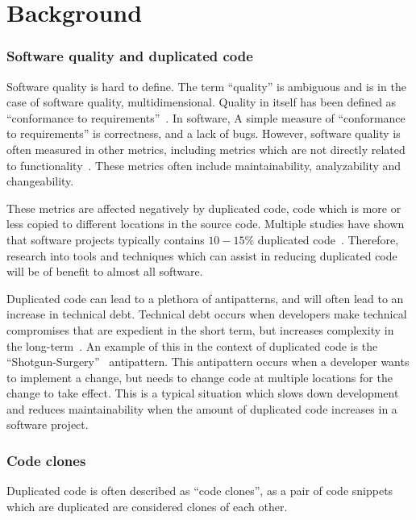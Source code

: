 \chapter{Background}


\subsection{Software quality and duplicated code}

Software quality is hard to define. The term ``quality'' is ambiguous and is in the case
of software quality, multidimensional. Quality in itself has been defined as ``conformance
to requirements''~\cite[8]{crosby1980quality}. In software, A simple measure of
``conformance to requirements'' is correctness, and a lack of bugs. However, software
quality is often measured in other metrics, including metrics which are not directly
related to functionality~\cite[29]{MetricsAndModelsInSoftwareQuality}. These metrics
often include maintainability, analyzability and changeability.

These metrics are affected negatively by duplicated code, code which is more or less
copied to different locations in the source code. Multiple studies have shown that
software projects typically contains $10-15\%$ duplicated code~\cite{CloningByAccident}.
Therefore, research into tools and techniques which can assist in reducing duplicated code
will be of benefit to almost all software.

Duplicated code can lead to a plethora of antipatterns, and will often lead to an increase
in technical debt. Technical debt occurs when developers make technical compromises that
are expedient in the short term, but increases complexity in the
long-term~\cite[111]{TechnicalDebt}. An example of this in the context of duplicated code
is the ``Shotgun-Surgery''~\cite[66]{fowlerrefactoring} antipattern. This antipattern
occurs when a developer wants to implement a change, but needs to change code at multiple
locations for the change to take effect. This is a typical situation which slows down
development and reduces maintainability when the amount of duplicated code increases in a
software project.

\subsection{Code clones}

Duplicated code is often described as ``code clones'', as a pair of code snippets which
are duplicated are considered clones of each other.


